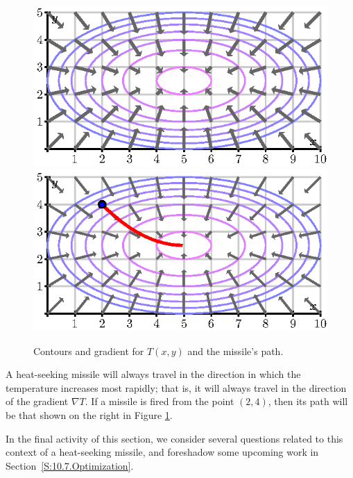   \begin{figure}[ht]
    \begin{center}
      \includegraphics{figures/fig_10_6_missile_grad.eps}
      \hspace*{20pt}
      \includegraphics{figures/fig_10_6_missile_path.eps}
    \end{center}	
    \caption{Contours and gradient for $T(x,y)$ and the missile's path.}
    \label{F:10.6.missile}
  \end{figure}

A heat-seeking missile will always travel in the direction in which
the temperature increases most rapidly;  that is, it will always
travel in the direction of the gradient $\nabla T$.  If a missile is
fired from the point $(2,4)$, then its path will be that shown on the
right in Figure \ref{F:10.6.missile}.

In the final activity of this section, we consider several questions related to this context of a heat-seeking missile, and foreshadow some upcoming work in Section~\ref{S:10.7.Optimization}.



